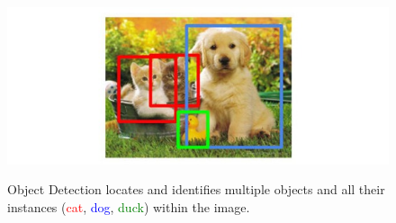 \documentclass[12pt,a4paper]{report}
\begin{document}
	\begin{figure}[h!]
		\caption{Object Detection locates and identifies multiple objects and all their 
		instances (\textcolor{red}{cat}, \textcolor{blue}{dog}, \textcolor{green}{duck}) 
		within the image.}
		\centering
		\includegraphics[width=\textwidth]{detect}
		\label{fig:det}
	\end{figure}
	
\end{document}
